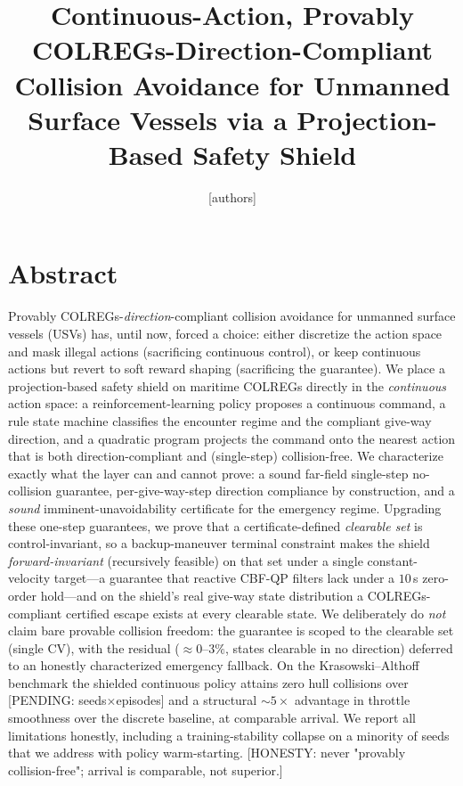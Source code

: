 \documentclass[12pt,letterpaper]{article}
\title{Continuous-Action, Provably COLREGs-Direction-Compliant
Collision Avoidance for Unmanned Surface Vessels via a
Projection-Based Safety Shield}
\author{[authors]}
\date{}
\theoremstyle{remark}\newtheorem*{scope}{Scope and honest limits}
\begin{document}
\maketitle

\section{Abstract}
Provably COLREGs-\emph{direction}-compliant collision avoidance for unmanned
surface vessels (USVs) has, until now, forced a choice: either discretize the
action space and mask illegal actions (sacrificing continuous control), or keep
continuous actions but revert to soft reward shaping (sacrificing the guarantee).
We place a projection-based safety shield on maritime COLREGs directly in the
\emph{continuous} action space: a reinforcement-learning policy proposes a
continuous command, a rule state machine classifies the encounter regime and the
compliant give-way direction, and a quadratic program projects the command onto
the nearest action that is both direction-compliant and (single-step)
collision-free. We characterize exactly what the layer can and cannot prove: a
sound far-field single-step no-collision guarantee, per-give-way-step direction
compliance by construction, and a \emph{sound} imminent-unavoidability certificate
for the emergency regime. Upgrading these one-step guarantees, we prove that a
certificate-defined \emph{clearable set} is control-invariant, so a backup-maneuver
terminal constraint makes the shield \emph{forward-invariant} (recursively feasible)
on that set under a single constant-velocity target---a guarantee that reactive
CBF-QP filters lack under a $10$\,s zero-order hold---and on the shield's real
give-way state distribution a COLREGs-compliant certified escape exists at every
clearable state. We deliberately do \emph{not} claim bare provable collision freedom:
the guarantee is scoped to the clearable set (single CV), with the residual
($\approx\!0$--$3\%$, states clearable in no direction) deferred to an honestly
characterized emergency fallback. On the Krasowski--Althoff benchmark the shielded continuous policy attains
zero hull collisions over [PENDING: seeds$\times$episodes] and a structural
$\sim\!5\times$ advantage in throttle smoothness over the discrete baseline, at
comparable arrival. We report all limitations honestly, including a
training-stability collapse on a minority of seeds that we address with
policy warm-starting. [HONESTY: never "provably collision-free"; arrival is
comparable, not superior.]
\end{document}
